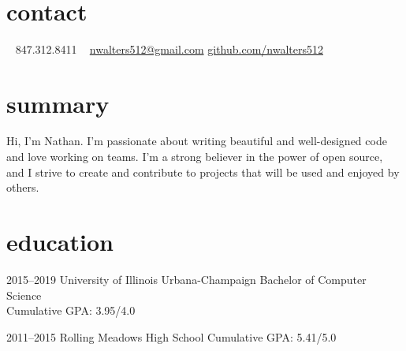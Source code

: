 \documentclass[nofooter]{resume}
\begin{document}


\begin{aside} %
~\vspace{-0.50cm} %
\section{contact}
\vspace{-0.20cm} %
~
847.312.8411
~
\href{mailto:nwalters512@gmail.com}{nwalters512@gmail.com}
\href{http://github.com/nwalters512}{github.com/nwalters512}
\end{aside}


\section{summary}

Hi, I'm Nathan.  I'm passionate about writing beautiful and well-designed code and love working on teams. I'm a strong believer in the power of open source, and I strive to create and contribute to projects that will be used and enjoyed by others.


\section{education}

\begin{entrylist}


\entry
{2015--2019}
{University of Illinois Urbana-Champaign}
{}
{Bachelor of Computer Science \\
Cumulative GPA: 3.95/4.0}


\entry
{2011--2015}
{Rolling Meadows High School}
{}
{Cumulative GPA: 5.41/5.0}


\end{entrylist}
\end{document}
